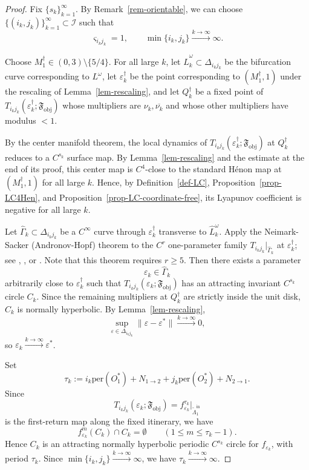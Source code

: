 \documentclass[11pt,a4paper]{article}
\theoremstyle{plain}
\theoremstyle{definition}
\theoremstyle{plain}
\numberwithin{equation}{section}
\begin{document}
\begin{proof}
Fix $\{s_k\}_{k=1}^\infty$. By Remark~\ref{rem-orientable}, we can choose $\{(i_k,j_k)\}_{k=1}^\infty \subset \mathcal{I}$ such that
\[
\varsigma_{i_kj_k} = 1,
\qquad
\min\{i_k,j_k\} \xrightarrow{k\to\infty} \infty.
\]

Choose $M_1^\dagger \in (0,3) \setminus \{5/4\}$. For all large $k$, let $\widehat{L}_k^\omega \subset \Delta_{i_kj_k}$ be the bifurcation curve corresponding to $L^\omega$, let $\varepsilon_k^\dagger$ be the point corresponding to $(M_1^\dagger,1)$ under the rescaling of Lemma~\ref{lem-rescaling}, and let $Q_k^\dagger$ be a fixed point of $T_{i_kj_k}(\varepsilon_k^\dagger;\mathfrak{F}_\mathrm{obj})$ whose multipliers are $\nu_k,\overline{\nu_k}$ and whose other multipliers have modulus $< 1$.

By the center manifold theorem, the local dynamics of $T_{i_kj_k}(\varepsilon_k^\dagger;\mathfrak{F}_\mathrm{obj})$ at $Q_k^\dagger$ reduces to a $C^{s_k}$ surface map. By Lemma~\ref{lem-rescaling} and the estimate at the end of its proof, this center map is $C^4$-close to the standard H\'enon map at $(M_1^\dagger,1)$ for all large $k$. Hence, by Definition~\ref{def-LC}, Proposition~\ref{prop-LC4Hen}, and Proposition~\ref{prop-LC-coordinate-free}, its Lyapunov coefficient is negative for all large $k$.

Let $\widehat{\Gamma}_k \subset \Delta_{i_kj_k}$ be a $C^\infty$ curve through $\varepsilon_k^\dagger$ transverse to $\widehat{L}_k^\omega$. Apply the Neimark-Sacker (Andronov-Hopf) theorem to the $C^r$ one-parameter family $T_{i_kj_k}|_{\widehat{\Gamma}_k}$ at $\varepsilon_k^\dagger$; see \cite[theorem~7.2]{RT1971}, \cite[theorem~6.2]{MarsdenMcCracken1976}, or \cite[Section~4]{K2023}. Note that this theorem requires $r \ge 5$. Then there exists a parameter
\[
\varepsilon_k \in \widehat{\Gamma}_k
\]
arbitrarily close to $\varepsilon_k^\dagger$ such that $T_{i_kj_k}(\varepsilon_k;\mathfrak{F}_\mathrm{obj})$ has an attracting invariant $C^{s_k}$ circle $C_k$. Since the remaining multipliers at $Q_k^\dagger$ are strictly inside the unit disk, $C_k$ is normally hyperbolic. By Lemma~\ref{lem-rescaling},
\[
\sup_{\varepsilon \in \Delta_{i_kj_k}} \|\varepsilon - \varepsilon^*\| \xrightarrow{k\to\infty} 0,
\]
so $\varepsilon_k \xrightarrow{k\to\infty} \varepsilon^*$.

Set
\[
\tau_k := i_k\mathrm{per}(O_1^*) + N_{1 \to 2} + j_k\mathrm{per}(O_2^*) + N_{2 \to 1}.
\]
Since
\[
T_{i_kj_k}(\varepsilon_k;\mathfrak{F}_\mathrm{obj})
=
f_{\varepsilon_k}^{\tau_k}\big|_{\widetilde{\Lambda}_1^\mathrm{in}}
\]
is the first-return map along the fixed itinerary, we have
\[
f_{\varepsilon_k}^m(C_k) \cap C_k = \emptyset
\qquad
(1 \le m \le \tau_k - 1).
\]
Hence $C_k$ is an attracting normally hyperbolic periodic $C^{s_k}$ circle for $f_{\varepsilon_k}$, with period $\tau_k$. Since $\min\{i_k,j_k\} \xrightarrow{k\to\infty} \infty$, we have $\tau_k \xrightarrow{k\to\infty} \infty$.
\end{proof}
\end{document}
